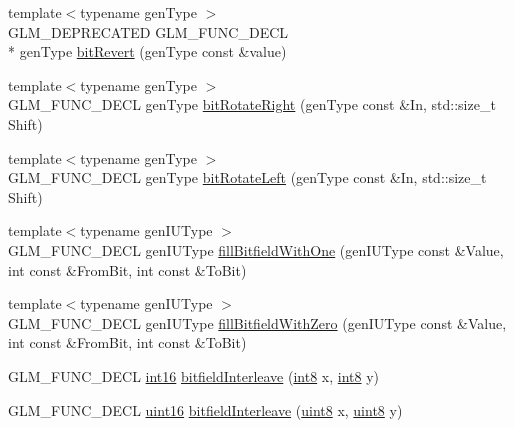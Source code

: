 \begin{DoxyCompactItemize}
\item 
{\footnotesize template$<$typename gen\-Type $>$ }\\G\-L\-M\-\_\-\-D\-E\-P\-R\-E\-C\-A\-T\-E\-D G\-L\-M\-\_\-\-F\-U\-N\-C\-\_\-\-D\-E\-C\-L \\*
gen\-Type \hyperlink{group__gtx__bit_ga2d3939fbf96aa54cb2fd3461a60aba02}{bit\-Revert} (gen\-Type const \&value)
\item 
{\footnotesize template$<$typename gen\-Type $>$ }\\G\-L\-M\-\_\-\-F\-U\-N\-C\-\_\-\-D\-E\-C\-L gen\-Type \hyperlink{group__gtx__bit_gaf999dbfe97a5be5ea68841a58cf89a4a}{bit\-Rotate\-Right} (gen\-Type const \&In, std\-::size\-\_\-t Shift)
\item 
{\footnotesize template$<$typename gen\-Type $>$ }\\G\-L\-M\-\_\-\-F\-U\-N\-C\-\_\-\-D\-E\-C\-L gen\-Type \hyperlink{group__gtx__bit_ga32c0a5149152a9aa75afafe81b19be53}{bit\-Rotate\-Left} (gen\-Type const \&In, std\-::size\-\_\-t Shift)
\item 
{\footnotesize template$<$typename gen\-I\-U\-Type $>$ }\\G\-L\-M\-\_\-\-F\-U\-N\-C\-\_\-\-D\-E\-C\-L gen\-I\-U\-Type \hyperlink{group__gtx__bit_gafac2a9e0ef0d5d2fc4e569bff2b2f452}{fill\-Bitfield\-With\-One} (gen\-I\-U\-Type const \&Value, int const \&From\-Bit, int const \&To\-Bit)
\item 
{\footnotesize template$<$typename gen\-I\-U\-Type $>$ }\\G\-L\-M\-\_\-\-F\-U\-N\-C\-\_\-\-D\-E\-C\-L gen\-I\-U\-Type \hyperlink{group__gtx__bit_ga0c514d45387003260783ba6a8a4f3285}{fill\-Bitfield\-With\-Zero} (gen\-I\-U\-Type const \&Value, int const \&From\-Bit, int const \&To\-Bit)
\item 
G\-L\-M\-\_\-\-F\-U\-N\-C\-\_\-\-D\-E\-C\-L \hyperlink{group__gtc__type__precision_ga2945a61d12771f8954994fcddf02b021}{int16} \hyperlink{group__gtx__bit_ga479134317bc95d99f2b2e235d3db287b}{bitfield\-Interleave} (\hyperlink{group__gtc__type__precision_ga96254f9c1c4506fc8eb5cf3301ce8565}{int8} x, \hyperlink{group__gtc__type__precision_ga96254f9c1c4506fc8eb5cf3301ce8565}{int8} y)
\item 
G\-L\-M\-\_\-\-F\-U\-N\-C\-\_\-\-D\-E\-C\-L \hyperlink{group__gtc__type__precision_gad8c2939e1fdd8e5828b31d95c52255d5}{uint16} \hyperlink{group__gtx__bit_ga0700a3ceb088a0ecc23d76c154096061}{bitfield\-Interleave} (\hyperlink{group__gtc__type__precision_ga1a7dcd8aac97cc8020817c94049deff2}{uint8} x, \hyperlink{group__gtc__type__precision_ga1a7dcd8aac97cc8020817c94049deff2}{uint8} y)

\end{DoxyCompactItemize}
